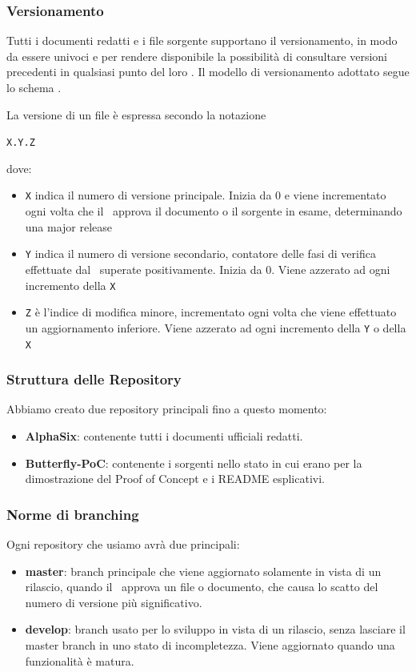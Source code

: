 		\subsubsection{Versionamento} \label{Versionamento}
		Tutti i documenti redatti e i file sorgente supportano il versionamento, in modo da essere univoci e per rendere disponibile la possibilità di consultare versioni
		precedenti in qualsiasi punto del loro .
		Il modello di versionamento adottato segue lo schema .\par
		La versione di un file è espressa secondo la notazione
			\begin{center}
			\texttt{X.Y.Z}
			\end{center}
			\indent dove:
			\begin{itemize}
				\item \texttt{X} indica il numero di versione principale. Inizia da 0 e viene incrementato ogni volta che il \Res\ approva il documento o il sorgente in esame,
					determinando una major release
				\item \texttt{Y} indica il numero di versione secondario, contatore delle fasi di verifica effettuate dal \Ver\ superate positivamente.
					Inizia da 0. Viene azzerato ad ogni incremento della \texttt{X}
				\item \texttt{Z} è l'indice di modifica minore, incrementato ogni volta che viene effettuato un aggiornamento inferiore.
				Viene azzerato ad ogni incremento della \texttt{Y} o della \texttt{X}
			\end{itemize}

		\subsubsection{Struttura delle Repository}
		Abbiamo creato due repository principali fino a questo momento:
		\begin{itemize}
			\item \textbf{AlphaSix}: contenente tutti i documenti ufficiali redatti.
			\item \textbf{Butterfly-PoC}: contenente i sorgenti nello stato in cui erano per la dimostrazione del Proof of Concept e i README esplicativi.
		\end{itemize}

		\subsubsection{Norme di branching}
		Ogni repository che usiamo avrà due  principali:
		\begin{itemize}
			\item \textbf{master}: branch principale che viene aggiornato solamente in vista di un rilascio, quando il \Res\ approva un file o documento, che causa
				lo scatto del numero di versione più significativo.
			\item \textbf{develop}: branch usato per lo sviluppo in vista di un rilascio, senza lasciare il master branch in uno stato di incompletezza. Viene aggiornato
				quando una funzionalità è matura.
		\end{itemize}

